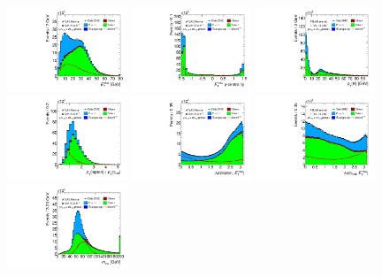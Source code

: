 \clearpage
\begin{figure}[tp]
  \centering
  \includegraphics[width=0.32\textwidth]{figures/presel/met-pt}
  \includegraphics[width=0.32\textwidth]{figures/presel/met-phi-centrality}
  \includegraphics[width=0.32\textwidth]{figures/presel/H-pt}
  \includegraphics[width=0.32\textwidth]{figures/presel/taulep-ptratio}
  \includegraphics[width=0.32\textwidth]{figures/presel/lepmet-dphi}
  \includegraphics[width=0.32\textwidth]{figures/presel/taumet-dphi}
  \includegraphics[width=0.32\textwidth]{figures/presel/mvis}

\end{figure}
